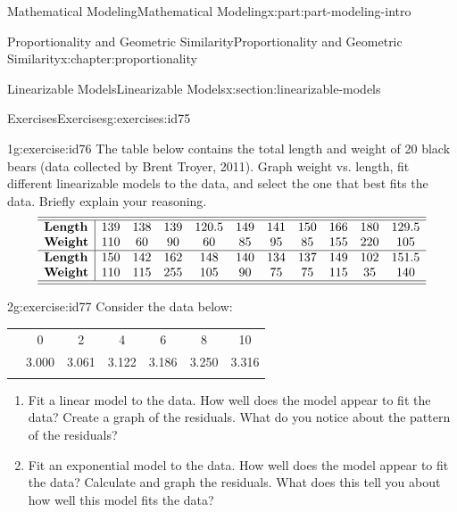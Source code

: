 \documentclass[oneside,10pt,]{book}
\newcommand{\tabularfont}{\relax}
\numberwithin{equation}{section}
\newcommand{\hrulethin}  {\noalign{\hrule height 0.04em}}
\newcommand{\hrulethick} {\noalign{\hrule height 0.11em}}
\begin{document}
\begin{partptx}{Mathematical Modeling}{}{Mathematical Modeling}{}{}{x:part:part-modeling-intro}
\begin{chapterptx}{Proportionality and Geometric Similarity}{}{Proportionality and Geometric Similarity}{}{}{x:chapter:proportionality}
\begin{sectionptx}{Linearizable Models}{}{Linearizable Models}{}{}{x:section:linearizable-models}
%
%
\typeout{************************************************}
\typeout{************************************************}
%
\begin{exercises-subsection}{Exercises}{}{Exercises}{}{}{g:exercises:id75}
\begin{divisionexercise}{1}{}{}{g:exercise:id76}%
The table below contains the total length and weight of 20 black bears (data collected by Brent Troyer, 2011). Graph weight vs. length, fit different linearizable models to the data, and select the one that best fits the data. Briefly explain your reasoning.%
%
\begin{equation*}
\begin{array}{l|cccccccccc}\hline\hline
\textbf{Length}& 139 & 138 & 139 & 120.5 & 149 & 141 & 150 & 166 & 180 & 129.5 \\
\textbf{Weight}& 110 & 60 & 90 & 60 & 85 & 95 & 85 & 155 & 220 & 105 \\\hline
\textbf{Length}& 150 & 142 & 162 & 148 & 140 & 134 & 137 & 149 & 102 & 151.5 \\
\textbf{Weight}& 110 & 115 & 255 & 105 & 90 & 75 & 75 & 115 & 35 & 140 \\\hline\hline
\end{array}
\end{equation*}
\end{divisionexercise}%
\begin{divisionexercise}{2}{}{}{g:exercise:id77}%
Consider the data below:%
\begin{center}%
{\tabularfont%
\begin{tabular}{ccccccc}\hrulethick
\multicolumn{1}{cA}{\(x\)}&0&2&4&6&8&10\tabularnewline\hrulethin
\multicolumn{1}{cA}{\(y\)}&3.000&3.061&3.122&3.186&3.250&3.316\tabularnewline\hrulethick
\end{tabular}
}%
\end{center}%
\begin{enumerate}[font=\bfseries,label=(\alph*),ref=\alph*]
\item{}Fit a linear model to the data. How well does the model appear to fit the data? Create a graph of the residuals. What do you notice about the pattern of the residuals?%
\item{}Fit an exponential model to the data. How well does the model appear to fit the data? Calculate and graph the residuals. What does this tell you about how well this model fits the data?%
\end{enumerate}
\end{divisionexercise}%

\end{exercises-subsection}
\end{sectionptx}
\end{chapterptx}
\end{partptx}
\end{document}
